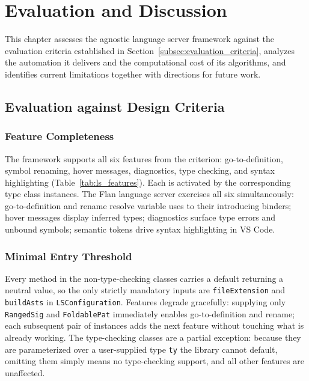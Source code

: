 \chapter{Evaluation and Discussion}
\label{chap:eval}

This chapter assesses the agnostic language server framework against the evaluation criteria established in Section~\ref{subsec:evaluation_criteria}, analyzes the automation it delivers and the computational cost of its algorithms, and identifies current limitations together with directions for future work.

\section{Evaluation against Design Criteria}
\label{sec:eval_criteria}

\subsection{Feature Completeness}

The framework supports all six features from the criterion: go-to-definition, symbol renaming, hover messages, diagnostics, type checking, and syntax highlighting (Table~\ref{tab:ls_features}).
Each is activated by the corresponding type class instances.
The Flan language server exercises all six simultaneously: go-to-definition and rename resolve variable uses to their introducing binders; hover messages display inferred types; diagnostics surface type errors and unbound symbols; semantic tokens drive syntax highlighting in VS Code.

\subsection{Minimal Entry Threshold}

Every method in the non-type-checking classes carries a default returning a neutral value, so the only strictly mandatory inputs are \texttt{fileExtension} and \texttt{buildAsts} in \texttt{LSConfiguration}.
Features degrade gracefully: supplying only \texttt{RangedSig} and \texttt{FoldablePat} immediately enables go-to-definition and rename; each subsequent pair of instances adds the next feature without touching what is already working.
The type-checking classes are a partial exception: because they are parameterized over a user-supplied type \texttt{ty} the library cannot default, omitting them simply means no type-checking support, and all other features are unaffected.

